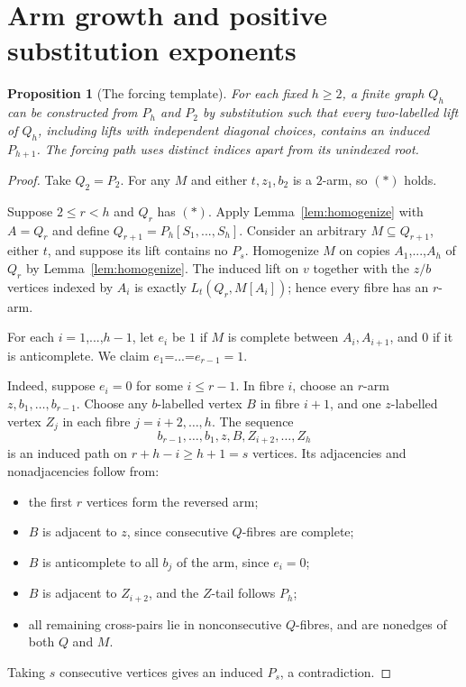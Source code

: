 \documentclass[11pt,a4paper]{article}
\newtheorem{proposition}[theorem]{Proposition}
\theoremstyle{definition}
\theoremstyle{remark}
\numberwithin{equation}{section}
\begin{document}
\section{Arm growth and positive substitution exponents}\label{sec:arm}
\begin{proposition}[The forcing template]\label{prop:forcing}
For each fixed \(h\ge2\), a finite graph \(Q_h\) can be constructed from \(P_h\) and \(P_2\) by substitution such that every two-labelled lift of \(Q_h\), including lifts with independent diagonal choices, contains an induced \(P_{h+1}\). The forcing path uses distinct indices apart from its unindexed root.
\end{proposition}\begin{proof}
Take \(Q_{2}=P_{2}\). For any \(M\) and either \(t,\allowbreak  z_{1},\allowbreak b_{2}\) is a \(2\)-arm, so \((\ast)\) holds.

Suppose \(2\le\allowbreak r<h\) and \(Q_{r}\) has \((\ast)\). Apply Lemma~\ref{lem:homogenize} with \(A=Q_{r}\) and define \(Q_{r+1} = P_{h}[S_{1},\allowbreak ...,\allowbreak S_{h}]\). Consider an arbitrary \(M \subseteq  Q_{r+1}\), either \(t\), and suppose its lift contains no \(P_{s}\). Homogenize \(M\) on copies \(A_{1}\),...,\(A_{h}\) of \(Q_{r}\) by Lemma~\ref{lem:homogenize}. The induced lift on \(v\) together with the \(z/b\) vertices indexed by \(A_{i}\) is exactly \(L_{t}(Q_{r},\allowbreak M[A_{i}])\); hence every fibre has an \(r\)-arm.

For each \(i=1\),...,\(h-1\), let \(e_{i}\) be \(1\) if \(M\) is complete between \(A_{i},\allowbreak A_{i+1}\), and \(0\) if it is anticomplete. We claim \(e_{1}\)=...=\(e_{r-1}=1\).

Indeed, suppose \(e_i=0\) for some \(i\le r-1\). In fibre \(i\), choose an \(r\)-arm \(z,b_1,\ldots,b_{r-1}\). Choose any \(b\)-labelled vertex \(B\) in fibre \(i+1\), and one \(z\)-labelled vertex \(Z_j\) in each fibre \(j=i+2,\ldots,h\). The sequence
\[
 b_{r-1},\ldots,b_1,z,B,Z_{i+2},\ldots,Z_h
\]
is an induced path on \(r+h-i\ge h+1=s\) vertices. Its adjacencies and nonadjacencies follow from:
\begin{itemize}
\item the first \(r\) vertices form the reversed arm;
\item \(B\) is adjacent to \(z\), since consecutive \(Q\)-fibres are complete;
\item \(B\) is anticomplete to all \(b_j\) of the arm, since \(e_i=0\);
\item \(B\) is adjacent to \(Z_{i+2}\), and the \(Z\)-tail follows \(P_h\);
\item all remaining cross-pairs lie in nonconsecutive \(Q\)-fibres, and are nonedges of both \(Q\) and \(M\).
\end{itemize}
Taking \(s\) consecutive vertices gives an induced \(P_s\), a contradiction.















\end{proof}
\end{document}

